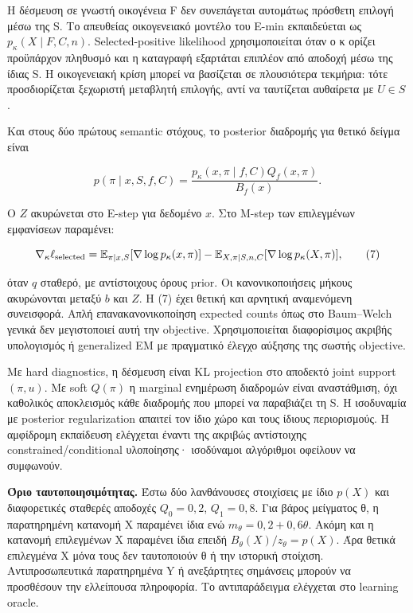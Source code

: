 \documentclass[
  10pt,
  a4paper,
]{report}
\begin{document}
Η δέσμευση σε γνωστή οικογένεια F δεν συνεπάγεται αυτομάτως πρόσθετη
επιλογή μέσω της S. Το απευθείας οικογενειακό μοντέλο του E-min
εκπαιδεύεται ως \(p_\kappa(X\mid F,C,n)\). Selected-positive likelihood
χρησιμοποιείται όταν ο κ ορίζει προϋπάρχον πληθυσμό και η καταγραφή
εξαρτάται επιπλέον από αποδοχή μέσω της ίδιας S. Η οικογενειακή κρίση
μπορεί να βασίζεται σε πλουσιότερα τεκμήρια: τότε προσδιορίζεται
ξεχωριστή μεταβλητή επιλογής, αντί να ταυτίζεται αυθαίρετα με
\(U\in S\).

Και στους δύο πρώτους semantic στόχους, το posterior διαδρομής για
θετικό δείγμα είναι

\[
p(\pi\mid x,S,f,C)=\frac{p_\kappa(x,\pi\mid f,C)Q_f(x,\pi)}{B_f(x)}.
\]

Ο \(Z\) ακυρώνεται στο E-step για δεδομένο \(x\). Στο M-step των
επιλεγμένων εμφανίσεων παραμένει:

\[
\nabla_\kappa\ell_{\rm selected}
=\mathbb E_{\pi\mid x,S}[\nabla\log p_\kappa(x,\pi)]
-\mathbb E_{X,\pi\mid S,n,C}[\nabla\log p_\kappa(X,\pi)],\tag{7}
\]

όταν \(q\) σταθερό, με αντίστοιχους όρους prior. Οι κανονικοποιήσεις
μήκους ακυρώνονται μεταξύ \(b\) και \(Z\). Η (7) έχει θετική και
αρνητική αναμενόμενη συνεισφορά. Απλή επανακανονικοποίηση expected
counts όπως στο Baum--Welch γενικά δεν μεγιστοποιεί αυτή την objective.
Χρησιμοποιείται διαφορίσιμος ακριβής υπολογισμός ή generalized EM με
πραγματικό έλεγχο αύξησης της σωστής objective.

Με hard diagnostics, η δέσμευση είναι KL projection στο αποδεκτό joint
support \((\pi,u)\). Με soft \(Q(\pi)\) η marginal ενημέρωση διαδρομών
είναι αναστάθμιση, όχι καθολικός αποκλεισμός κάθε διαδρομής που μπορεί
να παραβιάζει τη S. Η ισοδυναμία με posterior regularization απαιτεί τον
ίδιο χώρο και τους ίδιους περιορισμούς. Η αμφίδρομη εκπαίδευση ελέγχεται
έναντι της ακριβώς αντίστοιχης constrained/conditional υλοποίησης·
ισοδύναμοι αλγόριθμοι οφείλουν να συμφωνούν.

\textbf{Όριο ταυτοποιησιμότητας.} Έστω δύο λανθάνουσες στοιχίσεις με
ίδιο \(p(X)\) και διαφορετικές σταθερές αποδοχές \(Q_0=0,2\),
\(Q_1=0,8\). Για βάρος μείγματος θ, η παρατηρημένη κατανομή X παραμένει
ίδια ενώ \(m_θ=0,2+0,6θ\). Ακόμη και η κατανομή επιλεγμένων X παραμένει
ίδια επειδή \(B_θ(X)/z_θ=p(X)\). Άρα θετικά επιλεγμένα X μόνα τους δεν
ταυτοποιούν θ ή την ιστορική στοίχιση. Αντιπροσωπευτικά παρατηρημένα Y ή
ανεξάρτητες σημάνσεις μπορούν να προσθέσουν την ελλείπουσα πληροφορία.
Το αντιπαράδειγμα ελέγχεται στο learning oracle.
\end{document}
